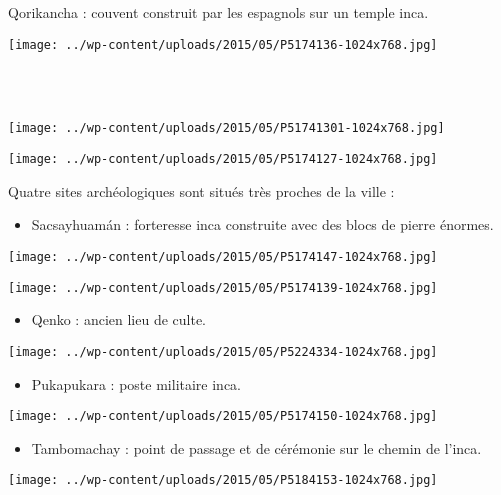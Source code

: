 Qorikancha : couvent construit par les espagnols sur un temple inca. 
\begin{center} \texttt{[image: ../wp-content/uploads/2015/05/P5174136-1024x768.jpg]} \end{center}
\vspace{-\topsep}
\pagebreak
~\\
~\\
\vspace{-0.25mm}
\begin{center} \texttt{[image: ../wp-content/uploads/2015/05/P51741301-1024x768.jpg]} \end{center}
\begin{center} \texttt{[image: ../wp-content/uploads/2015/05/P5174127-1024x768.jpg]} \end{center}
\vspace{-\topsep}
\vspace{-2.5mm}
\pagebreak

Quatre sites archéologiques sont situés très proches de la ville : 
\begin{itemize}
\item Sacsayhuamán : forteresse inca construite avec des blocs de pierre énormes. 
\end{itemize}
\vspace{-\topsep}
\begin{center} \texttt{[image: ../wp-content/uploads/2015/05/P5174147-1024x768.jpg]} \end{center}
\begin{center} \texttt{[image: ../wp-content/uploads/2015/05/P5174139-1024x768.jpg]} \end{center}
\vspace{-\topsep}
\vspace{-2.75mm}
\pagebreak
\begin{itemize}
\item Qenko : ancien lieu de culte.
\end{itemize}
\vspace{2mm}
\begin{center} \texttt{[image: ../wp-content/uploads/2015/05/P5224334-1024x768.jpg]} \end{center}
\begin{itemize}
\item Pukapukara : poste militaire inca. 
\end{itemize}
\begin{center} \texttt{[image: ../wp-content/uploads/2015/05/P5174150-1024x768.jpg]} \end{center}
\vspace{-\topsep}
\vspace{-1.75mm}
\pagebreak
\begin{itemize}
\item Tambomachay : point de passage et de cérémonie sur le chemin de l'inca. 
\end{itemize}
\begin{center} \texttt{[image: ../wp-content/uploads/2015/05/P5184153-1024x768.jpg]} \end{center}

